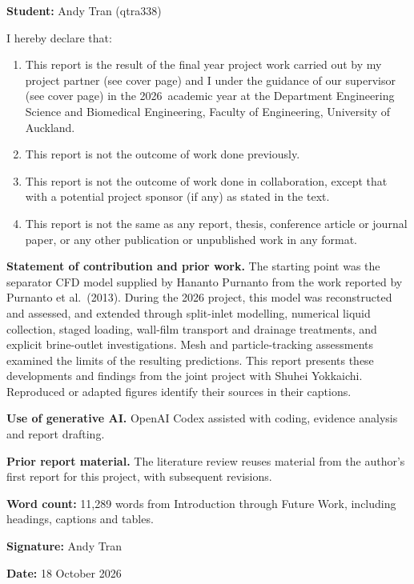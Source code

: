 \textbf{Student:} Andy Tran (qtra338)

I hereby declare that:

\begin{enumerate}
\def\labelenumi{\arabic{enumi}.}
\item
  This report is the result of the final year project work carried out by my project partner (see cover page) and I under the guidance of our supervisor (see cover page) in the 2026~academic year at the Department Engineering Science and Biomedical Engineering, Faculty of Engineering, University of Auckland.
\item
  This report is not the outcome of work done previously.
\item
  This report is not the outcome of work done in collaboration, except that with a potential project sponsor (if any) as stated in the text.
\item
  This report is not the same as any report, thesis, conference article or journal paper, or any other publication or unpublished work in any format.
\end{enumerate}

\textbf{Statement of contribution and prior work.} The starting point was the separator CFD model supplied by Hananto Purnanto from the work reported by Purnanto et al.~(2013). During the 2026 project, this model was reconstructed and assessed, and extended through split-inlet modelling, numerical liquid collection, staged loading, wall-film transport and drainage treatments, and explicit brine-outlet investigations. Mesh and particle-tracking assessments examined the limits of the resulting predictions. This report presents these developments and findings from the joint project with Shuhei Yokkaichi. Reproduced or adapted figures identify their sources in their captions.

\textbf{Use of generative AI.} OpenAI Codex assisted with coding, evidence analysis and report drafting.

\textbf{Prior report material.} The literature review reuses material from the author's first report for this project, with subsequent revisions.

\textbf{Word count:} 11,289 words from Introduction through Future Work, including headings, captions and tables.

\textbf{Signature:} Andy Tran

\textbf{Date:} 18 October 2026
